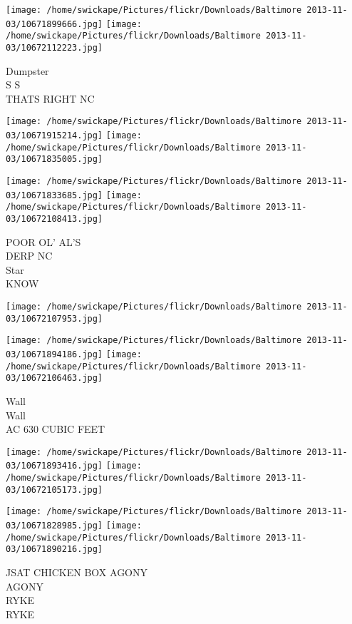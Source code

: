 \documentclass[10pt,letterpaper]{article}
\begin{document}
\vspace{0.25in}
\texttt{[image: /home/swickape/Pictures/flickr/Downloads/Baltimore 2013-11-03/10671899666.jpg]}
\texttt{[image: /home/swickape/Pictures/flickr/Downloads/Baltimore 2013-11-03/10672112223.jpg]}

Dumpster\\
S S\\
THATS RIGHT NC
\pagebreak

\texttt{[image: /home/swickape/Pictures/flickr/Downloads/Baltimore 2013-11-03/10671915214.jpg]}
\texttt{[image: /home/swickape/Pictures/flickr/Downloads/Baltimore 2013-11-03/10671835005.jpg]}

\texttt{[image: /home/swickape/Pictures/flickr/Downloads/Baltimore 2013-11-03/10671833685.jpg]}
\texttt{[image: /home/swickape/Pictures/flickr/Downloads/Baltimore 2013-11-03/10672108413.jpg]}

POOR OL' AL'S\\
DERP NC\\
Star\\
KNOW
\pagebreak

\texttt{[image: /home/swickape/Pictures/flickr/Downloads/Baltimore 2013-11-03/10672107953.jpg]}

\vspace{0.25in}
\texttt{[image: /home/swickape/Pictures/flickr/Downloads/Baltimore 2013-11-03/10671894186.jpg]}
\texttt{[image: /home/swickape/Pictures/flickr/Downloads/Baltimore 2013-11-03/10672106463.jpg]}

Wall\\
Wall\\
AC 630 CUBIC FEET
\pagebreak

\texttt{[image: /home/swickape/Pictures/flickr/Downloads/Baltimore 2013-11-03/10671893416.jpg]}
\texttt{[image: /home/swickape/Pictures/flickr/Downloads/Baltimore 2013-11-03/10672105173.jpg]}

\texttt{[image: /home/swickape/Pictures/flickr/Downloads/Baltimore 2013-11-03/10671828985.jpg]}
\texttt{[image: /home/swickape/Pictures/flickr/Downloads/Baltimore 2013-11-03/10671890216.jpg]}

JSAT CHICKEN BOX AGONY\\
AGONY\\
RYKE\\
RYKE
\pagebreak
\end{document}
